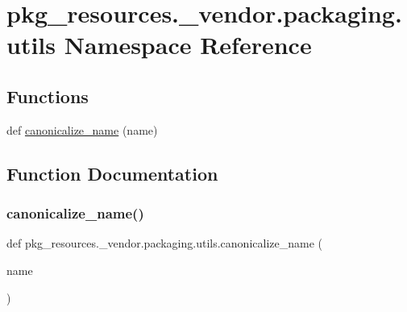 \hypertarget{namespacepkg__resources_1_1__vendor_1_1packaging_1_1utils}{}\section{pkg\+\_\+resources.\+\_\+vendor.\+packaging.\+utils Namespace Reference}
\label{namespacepkg__resources_1_1__vendor_1_1packaging_1_1utils}
\subsection*{Functions}
\begin{DoxyCompactItemize}
\item 
def \hyperlink{namespacepkg__resources_1_1__vendor_1_1packaging_1_1utils_adc58ab58907e9c52b95193d8560d8e15}{canonicalize\+\_\+name} (name)
\end{DoxyCompactItemize}


\subsection{Function Documentation}
\mbox{\label{namespacepkg__resources_1_1__vendor_1_1packaging_1_1utils_adc58ab58907e9c52b95193d8560d8e15}} 
\subsubsection{\texorpdfstring{canonicalize\+\_\+name()}{canonicalize\_name()}}
{\footnotesize\ttfamily def pkg\+\_\+resources.\+\_\+vendor.\+packaging.\+utils.\+canonicalize\+\_\+name (\begin{DoxyParamCaption}\item[{}]{name }\end{DoxyParamCaption})}

